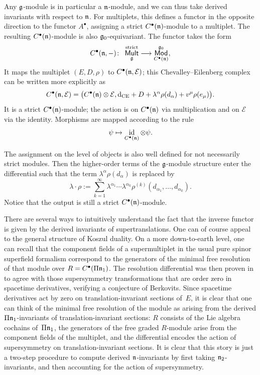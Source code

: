 \documentclass[pdftex]{sigma}
\numberwithin{equation}{section}
\def\cE{\mathcal E}\def\cF{\mathcal F}\def\cG{\mathcal G}\def\cH{\mathcal H}
\def\cat#1{\ensuremath{\mathsf{#1}}}
\DeclareMathOperator{\Mod}{\cat{Mod}}
\DeclareMathOperator{\Mult}{\cat{Mult}}
\def\bu{\bullet}
\def\d{{\rm d}}
\DeclareMathOperator{\id}{id}
\begin{document}
Any $\mathfrak g$-module is in particular a $\mathfrak n$-module, and we can thus take derived invariants with respect to $\mathfrak n$. For multiplets, this defines a functor in the opposite direction to the functor $A^\bullet$, assigning a strict $C^\bullet(\mathfrak n)$-module to a multiplet. The resulting $C^\bullet(\mathfrak n)$-module is also $\mathfrak g_0$-equivariant.
The functor takes the form
\begin{equation*}
C^\bullet(\fn , -) \colon \ \Mult_{\fg}^{\mathrm{strict}} \longrightarrow \Mod^{\fg_0}_{C^\bullet(\fn)},
\end{equation*}
It maps the multiplet	$(E,D,\rho)$ to $C^\bullet(\fn , \cE)$; this Chevalley--Eilenberg complex can be written more explicitly as
\begin{equation*}
C^\bullet(\fn , \cE) = \big( C^\bullet(\fn) \otimes \cE , \d_{\mathrm{CE}} + D + \lambda^\alpha \rho(d_\alpha) + v^\mu \rho(e_\mu) \big) .
\end{equation*}
It is a strict $C^\bullet(\mathfrak n)$-module; the action is on $C^\bullet(\mathfrak n)$ via multiplication and on $\cE$ via the identity. Morphisms are mapped according to the rule
\begin{equation*}
\psi \mapsto
\id_{C^\bullet(\fn)} \otimes \psi .
\end{equation*}

\begin{rmk}
	The assignment on the level of objects is also well defined for not necessarily strict modules. Then the higher-order terms of the $\mathfrak g$-module structure enter the differential such that the term $\lambda^\alpha \rho(d_\alpha)$ is replaced by
	\begin{equation*}
	\lambda \cdot \rho := \sum_{k=1}^{\infty} \lambda^{\alpha_1} \cdots \lambda^{\alpha_k} \rho^{(k)}(d_{\alpha_1} , \dots , d_{\alpha_k}).
	\end{equation*}
	Notice that the output is still a strict $C^\bullet(\mathfrak n)$-module.
\end{rmk}
There are several ways to intuitively understand the fact that the inverse functor is given by the derived invariants of supertranslations. One can of course appeal to the general structure of Koszul duality. On a more down-to-earth level, one can recall that the component fields of a supermultiplet in the usual pure spinor superfield formalism correspond to the generators of the minimal free resolution of that module over $R = C^\bu(\Pi \fn_1)$. The resolution differential was then proven in~\cite{perspectives} to agree with those supersymmetry transformations that are order zero in spacetime derivatives, verifying a conjecture of Berkovits. Since spacetime derivatives act by zero on translation-invariant sections of~$E$, it is clear that one can think of the minimal free resolution of the module as arising from the derived $\Pi \mathfrak n_1$-invariants of translation-invariant sections: $R$ consists of the Lie algebra cochains of~$\Pi \mathfrak n_1$, the generators of the free graded $R$-module arise from the component fields of the multiplet, and the differential encodes the action of supersymmetry on translation-invariant sections. It is clear that this story is just a two-step procedure to compute derived $\mathfrak n$-invariants by first taking $\mathfrak n_2$-invariants, and then accounting for the action of supersymmetry.
\end{document}
